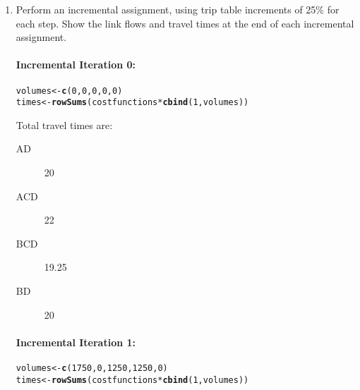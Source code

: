 \documentclass{texMemo}\usepackage[]{graphicx}\usepackage[]{color}
\makeatletter
\newcommand{\hlnum}[1]{\textcolor[rgb]{0.686,0.059,0.569}{#1}}%
\newcommand{\hlopt}[1]{\textcolor[rgb]{0,0,0}{#1}}%
\newcommand{\hlstd}[1]{\textcolor[rgb]{0.345,0.345,0.345}{#1}}%
\newcommand{\hlkwb}[1]{\textcolor[rgb]{0.69,0.353,0.396}{#1}}%
\newcommand{\hlkwd}[1]{\textcolor[rgb]{0.737,0.353,0.396}{\textbf{#1}}}%
\newenvironment{kframe}{%
 \def\at@end@of@kframe{}%
 \ifinner\ifhmode%
  \def\at@end@of@kframe{\end{minipage}}%
  \begin{minipage}{\columnwidth}%
 \fi\fi%
 \def\FrameCommand##1{\hskip\@totalleftmargin \hskip-\fboxsep
 \colorbox{shadecolor}{##1}\hskip-\fboxsep
     \hskip-\linewidth \hskip-\@totalleftmargin \hskip\columnwidth}%
 \MakeFramed {\advance\hsize-\width
   \@totalleftmargin\z@ \linewidth\hsize
   \@setminipage}}%
 {\par\unskip\endMakeFramed%
 \at@end@of@kframe}
\newenvironment{knitrout}{}{} %
\makeatother
\begin{document}
\begin{enumerate}
\item{Perform an incremental assignment, using trip table increments of 25\%
for each  step. Show the link flows and travel times at the end of each
incremental  assignment.}

\paragraph{Incremental Iteration 0:}
\begin{knitrout}\small
{}\color{fgcolor}\begin{kframe}
\begin{alltt}
\hlstd{volumes} \hlkwb{<-} \hlkwd{c}\hlstd{(}\hlnum{0}\hlstd{,}\hlnum{0}\hlstd{,}\hlnum{0}\hlstd{,}\hlnum{0}\hlstd{,}\hlnum{0}\hlstd{)}
\hlstd{times} \hlkwb{<-} \hlkwd{rowSums}\hlstd{(costfunctions} \hlopt{*} \hlkwd{cbind}\hlstd{(}\hlnum{1}\hlstd{, volumes))}
\end{alltt}
\end{kframe}
\end{knitrout}


\begin{center}
\end{center}
Total travel times are:
\begin{description}
\item[AD]{20}
\item[ACD]{22}
\item[BCD]{19.25}
\item[BD]{20}
\end{description}

\paragraph{Incremental Iteration 1:}
\begin{knitrout}\small
{}\color{fgcolor}\begin{kframe}
\begin{alltt}
\hlstd{volumes} \hlkwb{<-} \hlkwd{c}\hlstd{(}\hlnum{1750}\hlstd{,}\hlnum{0}\hlstd{,}\hlnum{1250}\hlstd{,}\hlnum{1250}\hlstd{,}\hlnum{0}\hlstd{)}
\hlstd{times} \hlkwb{<-} \hlkwd{rowSums}\hlstd{(costfunctions} \hlopt{*} \hlkwd{cbind}\hlstd{(}\hlnum{1}\hlstd{, volumes))}
\end{alltt}
\end{kframe}
\end{knitrout}



\end{enumerate}
\end{document}

